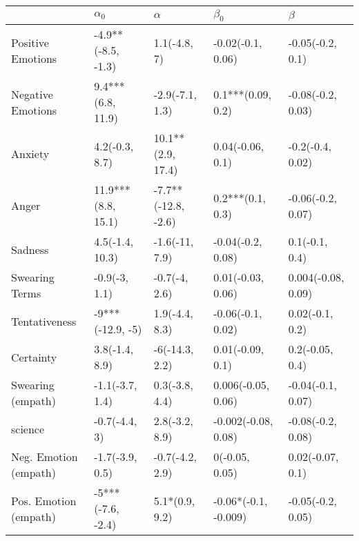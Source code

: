 \begin{tabular}{lllll}
\toprule
{} &          $\alpha_0$ &             $\alpha$ &             $\beta_0$ &             $\beta$ \\
\midrule
Positive Emotions     &  -4.9**(-8.5, -1.3) &         1.1(-4.8, 7) &     -0.02(-0.1, 0.06) &    -0.05(-0.2, 0.1) \\
Negative Emotions     &   9.4***(6.8, 11.9) &      -2.9(-7.1, 1.3) &     0.1***(0.09, 0.2) &   -0.08(-0.2, 0.03) \\
Anxiety               &      4.2(-0.3, 8.7) &    10.1**(2.9, 17.4) &      0.04(-0.06, 0.1) &    -0.2(-0.4, 0.02) \\
Anger                 &  11.9***(8.8, 15.1) &  -7.7**(-12.8, -2.6) &      0.2***(0.1, 0.3) &   -0.06(-0.2, 0.07) \\
Sadness               &     4.5(-1.4, 10.3) &       -1.6(-11, 7.9) &     -0.04(-0.2, 0.08) &      0.1(-0.1, 0.4) \\
Swearing Terms        &       -0.9(-3, 1.1) &        -0.7(-4, 2.6) &     0.01(-0.03, 0.06) &  0.004(-0.08, 0.09) \\
Tentativeness         &    -9***(-12.9, -5) &       1.9(-4.4, 8.3) &     -0.06(-0.1, 0.02) &     0.02(-0.1, 0.2) \\
Certainty             &      3.8(-1.4, 8.9) &       -6(-14.3, 2.2) &      0.01(-0.09, 0.1) &     0.2(-0.05, 0.4) \\
Swearing (empath)     &     -1.1(-3.7, 1.4) &       0.3(-3.8, 4.4) &    0.006(-0.05, 0.06) &   -0.04(-0.1, 0.07) \\
science               &       -0.7(-4.4, 3) &       2.8(-3.2, 8.9) &   -0.002(-0.08, 0.08) &   -0.08(-0.2, 0.08) \\
Neg. Emotion (empath) &     -1.7(-3.9, 0.5) &      -0.7(-4.2, 2.9) &        0(-0.05, 0.05) &    0.02(-0.07, 0.1) \\
Pos. Emotion (empath) &   -5***(-7.6, -2.4) &       5.1*(0.9, 9.2) &  -0.06*(-0.1, -0.009) &   -0.05(-0.2, 0.05) \\
\bottomrule
\end{tabular}
